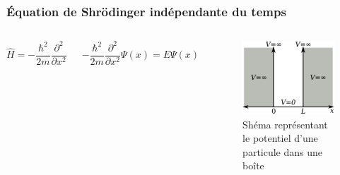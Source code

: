 \documentclass[aspectratio=169]{beamer}
\begin{document}
\begin{frame}
\frametitle{Équation de Shrödinger indépendante du temps}

\begin{columns}

\begin{equation}\tag{3}
\hat{H}=-\frac{\hbar^2}{2m}\frac{\partial^2}{\partial x^2}
\end{equation} 

\begin{equation}\tag{4}
-\frac{\hbar^2}{2m}\frac{\partial^2}{\partial x^2}\Psi(x)=E\Psi(x)
\end{equation} 

\begin{figure}
\includegraphics[scale=0.4]{Pot}
\caption{Shéma représentant le potentiel d'une particule dans une boîte}
\end{figure}
\end{columns}

\end{frame}
\end{document}
